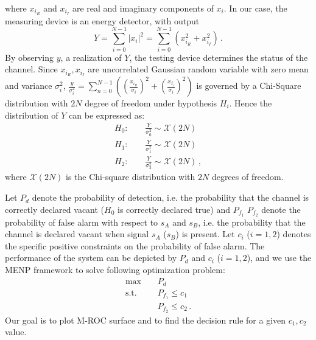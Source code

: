 where $x_{i_R}$ and $x_{i_I}$ are real and imaginary components of $x_i$.
In our case, the measuring device is an energy detector, with output 
\begin{equation} 
  Y = \sum_{i=0}^{N-1}|x_i|^2 = \sum_{i=0}^{N-1}(x_{i_R}^2+x_{i_I}^2)\,.
  \label{equ: testing device}
\end{equation}
By observing $y$, a realization of $Y$, the testing device determines the status of the channel. 
Since $x_{i_R}, x_{i_I}$ are uncorrelated Gaussian random variable with zero mean and variance $\sigma_i^2$, $\frac{y}{\sigma_i^2} = \sum_{n=0}^{N-1}((\frac{x_{i_R}}{\sigma_i})^2 + (\frac{x_{I_i}}{\sigma_i})^2)$ is governed by a Chi-Square distribution with $2N$ degree of freedom under hypothesis $H_i$.
Hence the distribution of $Y$ can be expressed as:
\begin{equation} 
  \label{equ: abstract}
  \begin{split}
	H_0:\;\;\;\;&\frac{Y}{\sigma_0^2}\sim \mathcal{X}(2N)\\
	H_1:\;\;\;\;&\frac{Y}{\sigma_1^2}\sim \mathcal{X}(2N)\\
	H_2:\;\;\;\;&\frac{Y}{\sigma_2^2}\sim \mathcal{X}(2N)\,,
  \end{split}
\end{equation}
where $\mathcal{X}(2N)$ is the Chi-square distribution with $2N$ degrees of freedom. 

Let $P_d$ denote the probability of detection, i.e. the probability that the channel is correctly declared vacant ($H_0$ is correctly declared true) and $P_{f_1}$ $P_{f_2}$ denote the probability of false alarm with respect to $s_A$  and $s_B$, i.e. the probability that the channel is declared vacant when signal $s_A$ ($s_B$) is present. Let $c_i$ ($i = 1, 2$) denotes the specific positive constraints on the probability of false alarm. The performance of the system can be depicted by $P_d$ and $c_i$ ($i = 1, 2$), and we use the MENP framework to solve following optimization problem:
\begin{equation}
  \begin{split}
	\max\;\;\;\;&P_d\\
	\text{s.t.}\;\;\;\;&P_{f_1}\leq c_1\\
	&P_{f_2} \leq c_2\,.
  \end{split}
  \label{1129a3}
\end{equation}
Our goal is to plot M-ROC surface and to find the decision rule for a given $c_1, c_2$ value.


